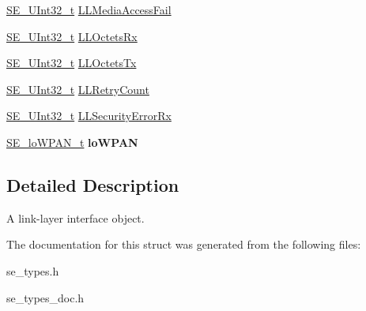 \begin{DoxyCompactItemize}
\item 
\hyperlink{group__UInt32_ga70bd4ecda3c0c85d20779d685a270cdb}{S\+E\+\_\+\+U\+Int32\+\_\+t} \hyperlink{group__LLInterface_ga50e029d2042a334b98066e875e95879d}{L\+L\+Media\+Access\+Fail}
\item 
\hyperlink{group__UInt32_ga70bd4ecda3c0c85d20779d685a270cdb}{S\+E\+\_\+\+U\+Int32\+\_\+t} \hyperlink{group__LLInterface_ga84ccf99bfd9658ce936851fdb77870b0}{L\+L\+Octets\+Rx}
\item 
\hyperlink{group__UInt32_ga70bd4ecda3c0c85d20779d685a270cdb}{S\+E\+\_\+\+U\+Int32\+\_\+t} \hyperlink{group__LLInterface_gaf066ed5c9c829bca58631b4f14037851}{L\+L\+Octets\+Tx}
\item 
\hyperlink{group__UInt32_ga70bd4ecda3c0c85d20779d685a270cdb}{S\+E\+\_\+\+U\+Int32\+\_\+t} \hyperlink{group__LLInterface_gad89a03017476955c94cc21ad73dfc140}{L\+L\+Retry\+Count}
\item 
\hyperlink{group__UInt32_ga70bd4ecda3c0c85d20779d685a270cdb}{S\+E\+\_\+\+U\+Int32\+\_\+t} \hyperlink{group__LLInterface_ga2ddb6e5f1bdcd13ad802cc379bd0f29e}{L\+L\+Security\+Error\+Rx}
\item 
\hyperlink{structSE__loWPAN__t}{S\+E\+\_\+lo\+W\+P\+A\+N\+\_\+t} {\bfseries lo\+W\+P\+AN}
\end{DoxyCompactItemize}


\subsection{Detailed Description}
A link-\/layer interface object. 

The documentation for this struct was generated from the following files\+:\begin{DoxyCompactItemize}
\item 
se\+\_\+types.\+h\item 
se\+\_\+types\+\_\+doc.\+h\end{DoxyCompactItemize}
